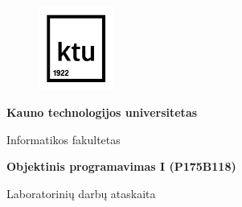 \documentclass{article}
\begin{document}
\makeatletter
\renewcommand*\env@matrix[1][\arraystretch]{%
  \edef\arraystretch{#1}%
  \hskip -\arraycolsep
  \let\@ifnextchar\new@ifnextchar
  \array{*\c@MaxMatrixCols c}}
\makeatother

\makeatletter
\renewcommand\tableofcontents{%
  \null\hfill\textbf{\Large\contentsname}\hfill\null\par
  \@mkboth{\MakeUppercase\contentsname}{\MakeUppercase\contentsname}%
  \@starttoc{toc}%
}
\makeatother






\begin{figure}[!ht]
    \centering
    \includegraphics[width=2.5cm]{Assets/ktu-ikona.png}
\end{figure}

\vspace{-0.8cm}

\begin{center}
    \Large\textbf{Kauno technologijos universitetas}
\end{center}

\vspace{-0.6cm}

\begin{center}
    \large{Informatikos fakultetas}
\end{center}

\vspace{5cm}

\begin{center}
    \LARGE\textbf{Objektinis programavimas I (P175B118)}
\end{center}

\vspace{-0.5cm}

\begin{center}
    \Large{Laboratorinių darbų ataskaita}
\end{center}
\end{document}
